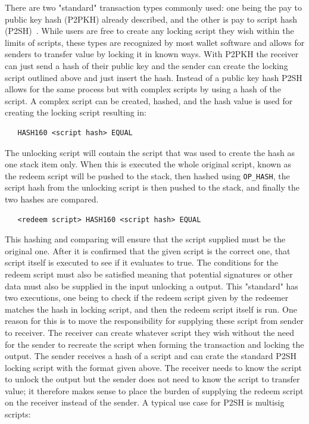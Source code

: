 There are two "standard" transaction types commonly used: one being the pay to public key hash (P2PKH) already described, and the other is pay to script hash (P2SH)~\cite{BIP16}. While users are free to create any locking script they wish within the limits of scripts, these types are recognized by most wallet software and allows for senders to transfer value by locking it in known ways. With P2PKH the receiver can just send a hash of their public key and the sender can create the locking script outlined above and just insert the hash. Instead of a public key hash P2SH allows for the same process but with complex scripts by using a hash of the script. A complex script can be created, hashed, and the hash value is used for creating the locking script resulting in:

\begin{verbatim}
   HASH160 <script hash> EQUAL
\end{verbatim}

The unlocking script will contain the script that was used to create the hash as one stack item only. When this is executed the whole original script, known as the redeem script will be pushed to the stack, then hashed using {\tt OP\_HASH}, the script hash from the unlocking script is then pushed to the stack, and finally the two hashes are compared.

\begin{verbatim}
   <redeem script> HASH160 <script hash> EQUAL
\end{verbatim}

This hashing and comparing will ensure that the script supplied must be the original one. After it is confirmed that the given script is the correct one, that script itself is executed to see if it evaluates to true. The conditions for the redeem script must also be satisfied meaning that potential signatures or other data must also be supplied in the input unlocking a output. This "standard" has two executions, one being to check if the redeem script given by the redeemer matches the hash in locking script, and then the redeem script itself is run.
One reason for this is to move the responsibility for supplying these script from sender to receiver. The receiver can create whatever script they wish without the need for the sender to recreate the script when forming the transaction and locking the output. The sender receives a hash of a script and can crate the standard P2SH locking script with the format given above. The receiver needs to know the script to unlock the output but the sender does not need to know the script to transfer value; it therefore makes sense to place the burden of supplying the redeem script on the receiver instead of the sender. A typical use case for P2SH is multisig scripts: 

